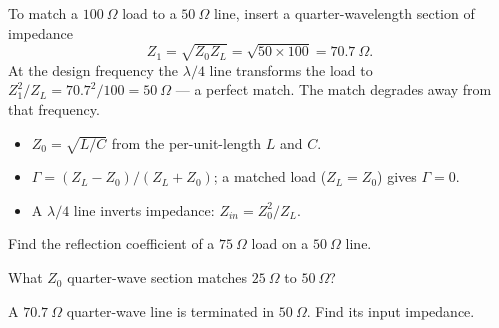 \begin{workedexample}
To match a $100\ \Omega$ load to a $50\ \Omega$ line, insert a
quarter-wavelength section of impedance
\[ Z_1 = \sqrt{Z_0 Z_L} = \sqrt{50\times100} = 70.7\ \Omega. \]
At the design frequency the $\lambda/4$ line transforms the load to
$Z_1^2/Z_L = 70.7^2/100 = 50\ \Omega$ --- a perfect match. The match degrades
away from that frequency.
\end{workedexample}

\begin{keytakeaways}
\begin{itemize}[leftmargin=1.4em,itemsep=2pt]
\item $Z_0 = \sqrt{L/C}$ from the per-unit-length $L$ and $C$.
\item $\Gamma = (Z_L - Z_0)/(Z_L + Z_0)$; a matched load ($Z_L = Z_0$) gives $\Gamma = 0$.
\item A $\lambda/4$ line inverts impedance: $Z_{in} = Z_0^2/Z_L$.
\end{itemize}
\end{keytakeaways}

\begin{exercises}
\item Find the reflection coefficient of a $75\ \Omega$ load on a $50\ \Omega$ line.
\item What $Z_0$ quarter-wave section matches $25\ \Omega$ to $50\ \Omega$?
\item A $70.7\ \Omega$ quarter-wave line is terminated in $50\ \Omega$. Find its input impedance.
\end{exercises}

